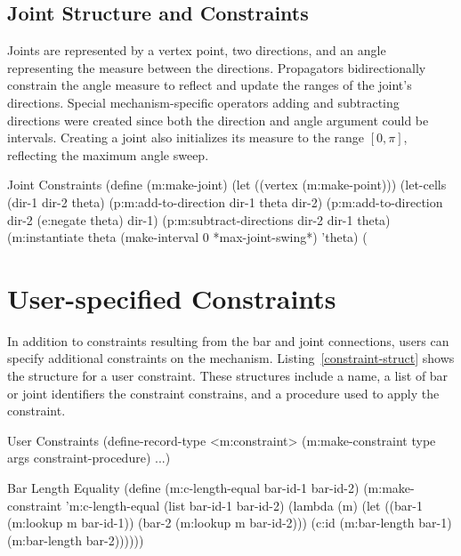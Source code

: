 \subsection{Joint Structure and Constraints}

Joints are represented by a vertex point, two directions, and an angle
representing the measure between the directions. Propagators
bidirectionally constrain the angle measure to reflect and update the
ranges of the joint's directions.  Special mechanism-specific
operators adding and subtracting directions were created since both
the direction and angle argument could be intervals. Creating a joint
also initializes its measure to the range $[0, \pi]$, reflecting the
maximum angle sweep.

\begin{code-listing}
{Joint Constraints}
(define (m:make-joint)
  (let ((vertex (m:make-point)))
    (let-cells (dir-1 dir-2 theta)
      (p:m:add-to-direction dir-1 theta dir-2)
      (p:m:add-to-direction dir-2 (e:negate theta) dir-1)
      (p:m:subtract-directions dir-2 dir-1 theta)
      (m:instantiate theta (make-interval 0 *max-joint-swing*) 'theta)
      (%
\end{code-listing}

\enlargethispage*{\baselineskip}
\vspace{-1em}
\section{User-specified Constraints}

In addition to constraints resulting from the bar and joint
connections, users can specify additional constraints on the
mechanism. Listing~\ref{constraint-struct} shows the structure for a
user constraint. These structures include a name, a list of bar or
joint identifiers the constraint constrains, and a procedure used to
apply the constraint.

\begin{code-listing}
[label=constraint-struct]
{User Constraints}
(define-record-type <m:constraint>
  (m:make-constraint type args constraint-procedure) ...)
\end{code-listing}
\begin{code-listing}
[label=bar-eq]
{Bar Length Equality}
(define (m:c-length-equal bar-id-1 bar-id-2)
  (m:make-constraint
   'm:c-length-equal
   (list bar-id-1 bar-id-2)
   (lambda (m)
     (let ((bar-1 (m:lookup m bar-id-1))
           (bar-2 (m:lookup m bar-id-2)))
       (c:id (m:bar-length bar-1)
             (m:bar-length bar-2))))))
\end{code-listing}

